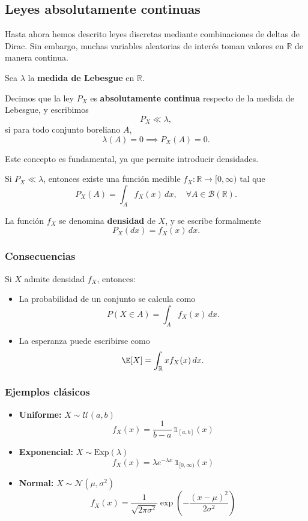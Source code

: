 \subsection{Leyes absolutamente continuas}

Hasta ahora hemos descrito leyes discretas mediante combinaciones de deltas de Dirac. Sin embargo, muchas variables aleatorias de interés toman valores en $\mathbb{R}$ de manera continua.

Sea $\lambda$ la \textbf{medida de Lebesgue} en $\mathbb{R}$.

\begin{defi}
Decimos que la ley $P_X$ es \textbf{absolutamente continua} respecto de la medida de Lebesgue, y escribimos
\[
P_X \ll \lambda,
\]
si para todo conjunto boreliano $A$,
\[
\lambda(A) = 0 \implies P_X(A) = 0.
\]
\end{defi}

Este concepto es fundamental, ya que permite introducir densidades.

\begin{teo}
Si $P_X \ll \lambda$, entonces existe una función medible $f_X:\mathbb{R} \to [0,\infty)$ tal que
\[
P_X(A) = \int_A f_X(x)\,dx, \quad \forall A \in \mathcal{B}(\mathbb{R}).
\]
\end{teo}

La función $f_X$ se denomina \textbf{densidad} de $X$, y se escribe formalmente
\[
P_X(dx) = f_X(x)\,dx.
\]

\subsubsection*{Consecuencias}

Si $X$ admite densidad $f_X$, entonces:

\begin{itemize}
\item La probabilidad de un conjunto se calcula como
\[
P(X \in A) = \int_A f_X(x)\,dx.
\]

\item La esperanza puede escribirse como
\[
\E[X] = \int_{\mathbb{R}} x f_X(x)\,dx.
\]
\end{itemize}

\subsubsection*{Ejemplos clásicos}

\begin{itemize}
\item \textbf{Uniforme:} $X \sim \mathcal{U}(a,b)$
\[
f_X(x) = \frac{1}{b-a}\,\mathbb{1}_{[a,b]}(x)
\]

\item \textbf{Exponencial:} $X \sim \mathrm{Exp}(\lambda)$
\[
f_X(x) = \lambda e^{-\lambda x}\,\mathbb{1}_{[0,\infty)}(x)
\]

\item \textbf{Normal:} $X \sim \mathcal{N}(\mu,\sigma^2)$
\[
f_X(x) = \frac{1}{\sqrt{2\pi\sigma^2}}
\exp\left(-\frac{(x-\mu)^2}{2\sigma^2}\right)
\]
\end{itemize}

